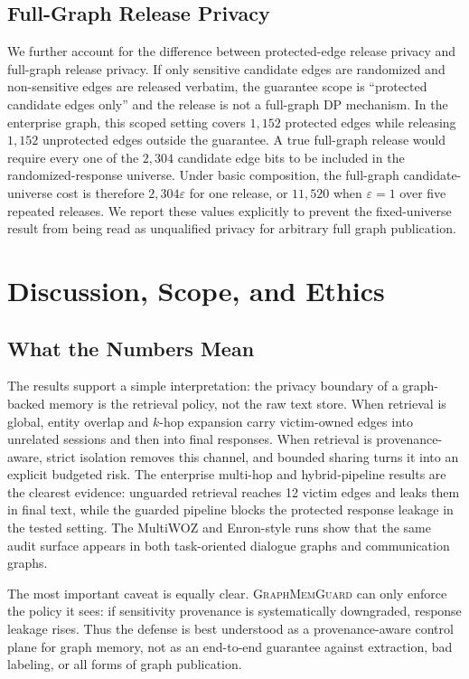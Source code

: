 \documentclass[journal,10pt,twocolumn]{IEEEtran}
\begin{document}
\subsection{Full-Graph Release Privacy}
We further account for the difference between protected-edge release
privacy and full-graph release privacy. If only sensitive candidate
edges are randomized and non-sensitive edges are released verbatim,
the guarantee scope is ``protected candidate edges only'' and the
release is not a full-graph DP mechanism. In the enterprise graph,
this scoped setting covers $1,152$ protected edges while releasing
$1,152$ unprotected edges outside the guarantee. A true full-graph
release would require every one of the $2,304$ candidate edge bits to
be included in the randomized-response universe. Under basic
composition, the full-graph candidate-universe cost is therefore
$2,304\varepsilon$ for one release, or $11,520$ when
$\varepsilon{=}1$ over five repeated releases. We report these values
explicitly to prevent the fixed-universe result from being read as
unqualified privacy for arbitrary full graph publication.

\section{Discussion, Scope, and Ethics}
\label{sec:discussion}

\subsection{What the Numbers Mean}
The results support a simple interpretation: the privacy boundary of a
graph-backed memory is the retrieval policy, not the raw text store.
When retrieval is global, entity overlap and $k$-hop expansion carry
victim-owned edges into unrelated sessions and then into final
responses. When retrieval is provenance-aware, strict isolation
removes this channel, and bounded sharing turns it into an explicit
budgeted risk. The enterprise multi-hop and hybrid-pipeline results
are the clearest evidence: unguarded retrieval reaches 12 victim
edges and leaks them in final text, while the guarded pipeline blocks
the protected response leakage in the tested setting. The MultiWOZ
and Enron-style runs show that the same audit surface appears in both
task-oriented dialogue graphs and communication graphs.

The most important caveat is equally clear. \textsc{GraphMemGuard}
can only enforce the policy it sees: if sensitivity provenance is
systematically downgraded, response leakage rises. Thus the defense is
best understood as a provenance-aware control plane for graph memory,
not as an end-to-end guarantee against extraction, bad labeling, or
all forms of graph publication.
\end{document}
